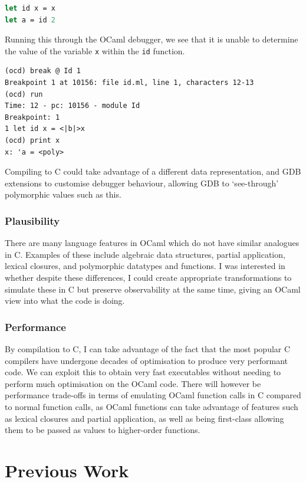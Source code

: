\begin{lstlisting}[language=Caml]
let id x = x
let a = id 2
\end{lstlisting}

Running this through the OCaml debugger, we see that it is unable to determine
the value of the variable \texttt{x} within the \texttt{id} function.

\begin{lstlisting}
(ocd) break @ Id 1
Breakpoint 1 at 10156: file id.ml, line 1, characters 12-13
(ocd) run
Time: 12 - pc: 10156 - module Id
Breakpoint: 1
1 let id x = <|b|>x
(ocd) print x
x: 'a = <poly>
\end{lstlisting}

Compiling to C could take advantage of a different data representation, and GDB
extensions to customise debugger behaviour, allowing GDB to `see-through'
polymorphic values such as this.

\subsubsection{Plausibility} There are many language features in OCaml which do
not have similar analogues in C. Examples of these include algebraic data
structures, partial application, lexical closures, and polymorphic datatypes and
functions. I was interested in whether despite these differences, I could create
appropriate transformations to simulate these in C but preserve observability at
the same time, giving an OCaml view into what the code is doing.

\subsubsection{Performance}

By compilation to C, I can take advantage of the fact that the most popular C 
compilers have undergone decades of optimisation to produce very performant 
code. We can exploit this to obtain very fast executables without needing to 
perform much optimisation on the OCaml code. There will however be performance 
trade-offs in terms of emulating OCaml function calls in C compared to normal 
function calls, as OCaml functions can take advantage of features such as
lexical closures and partial application, as well as being first-class allowing
them to be passed as values to higher-order functions.

\section{Previous Work}

